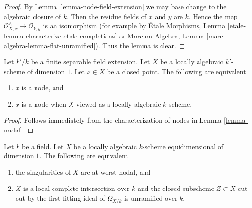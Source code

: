 \begin{proof}
By Lemma \ref{lemma-node-field-extension}
we may base change to the algebraic closure of $k$.
Then the residue fields of $x$ and $y$ are $k$.
Hence the map $\mathcal{O}_{X, x}^\wedge \to \mathcal{O}_{Y, y}$
is an isomorphism (for example by
\'Etale Morphisms, Lemma \ref{etale-lemma-characterize-etale-completions} or
More on Algebra, Lemma \ref{more-algebra-lemma-flat-unramified}).
Thus the lemma is clear.
\end{proof}

\begin{lemma}
\label{lemma-node-over-separable-extension}
Let $k'/k$ be a finite separable field extension.
Let $X$ be a locally algebraic $k'$-scheme of dimension $1$.
Let $x \in X$ be a closed point. The following are equivalent
\begin{enumerate}
\item $x$ is a node, and
\item $x$ is a node when $X$ viewed as a locally algebraic $k$-scheme.
\end{enumerate}
\end{lemma}

\begin{proof}
Follows immediately from the characterization of nodes in
Lemma \ref{lemma-nodal}.
\end{proof}

\begin{lemma}
\label{lemma-nodal-lci}
Let $k$ be a field. Let $X$ be a locally algebraic $k$-scheme
equidimensional of dimension $1$.
The following are equivalent
\begin{enumerate}
\item the singularities of $X$ are at-worst-nodal, and
\item $X$ is a local complete intersection over $k$
and the closed subscheme $Z \subset X$ cut out by the
first fitting ideal of $\Omega_{X/k}$ is unramified over $k$.
\end{enumerate}
\end{lemma}

